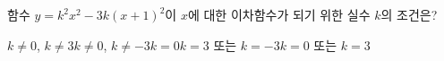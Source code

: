 함수 $y=k^2x^2-3k(x+1)^2$이 $x$에 대한 이차함수가 되기 위한 실수 $k$의 조건은?
\begin{choicesii}{$k\ne 0$, $k\ne 3$}{$k\ne 0$, $k\ne -3$}{$k=0$}{$k=3$ 또는 $k=-3$}{$k=0$ 또는 $k=3$}\end{choicesii}
